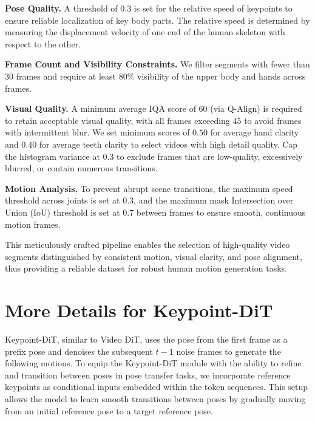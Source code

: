 \noindent\textbf{Pose Quality.} A threshold of $0.3$ is set for the relative speed of keypoints to ensure reliable localization of key body parts. The relative speed is determined by measuring the displacement velocity of one end of the human skeleton with respect to the other.

\noindent\textbf{Frame Count and Visibility Constraints.} We filter segments with fewer than $30$ frames and require at least $80\%$ visibility of the upper body and hands across frames.

\noindent\textbf{Visual Quality.} A minimum average IQA score of $60$ (via Q-Align) is required to retain acceptable visual quality, with all frames exceeding $45$ to avoid frames with intermittent blur. We set minimum scores of $0.50$ for average hand clarity and $0.40$ for average teeth clarity to select videos with high detail quality. Cap the histogram variance at $0.3$ to exclude frames that are low-quality, excessively blurred, or contain numerous transitions.

\noindent\textbf{Motion Analysis.} To prevent abrupt scene transitions, the maximum speed threshold across joints is set at $0.3$, and the maximum mask Intersection over Union (IoU) threshold is set at 0.7 between frames to ensure smooth, continuous motion frames.

This meticulously crafted pipeline enables the selection of high-quality video segments distinguished by consistent motion, visual clarity, and pose alignment, thus providing a reliable dataset for robust human motion generation tasks.


\section{More Details for Keypoint-DiT}
\label{sec:sup_posegeneration}

Keypoint-DiT, similar to Video DiT, uses the pose from the first frame as a prefix pose and denoises the subsequent $t-1$ noise frames to generate the following motions. To equip the Keypoint-DiT module with the ability to refine and transition between poses in pose transfer tasks, we incorporate reference keypoints as conditional inputs embedded within the token sequences. This setup allows the model to learn smooth transitions between poses by gradually moving from an initial reference pose to a target reference pose.

